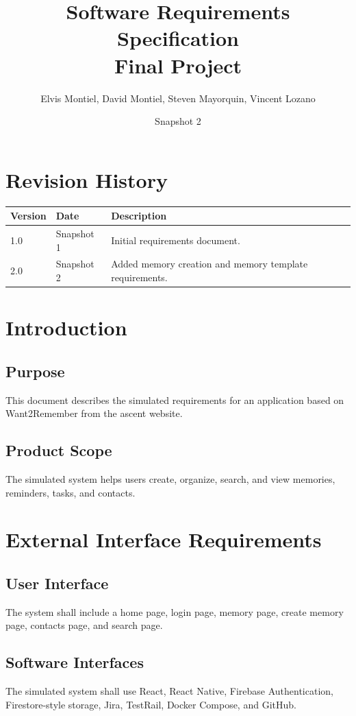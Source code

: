 \documentclass{article}
\title{Software Requirements Specification\\Final Project}
\author{Elvis Montiel, David Montiel, Steven Mayorquin, Vincent Lozano}
\date{Snapshot 2}
\begin{document}
\maketitle
\tableofcontents
\newpage

\section{Revision History}
\begin{longtable}{|p{2cm}|p{3cm}|p{8cm}|}
\hline
Version & Date & Description \\ \hline
1.0 & Snapshot 1 & Initial requirements document. \\ \hline
2.0 & Snapshot 2 & Added memory creation and memory template requirements. \\ \hline
\end{longtable}

\section{Introduction}
\subsection{Purpose}
This document describes the simulated requirements for an application based on Want2Remember from the ascent website.

\subsection{Product Scope}
The simulated system helps users create, organize, search, and view memories, reminders, tasks, and contacts.

\section{External Interface Requirements}
\subsection{User Interface}
The system shall include a home page, login page, memory page, create memory page, contacts page, and search page.

\subsection{Software Interfaces}
The simulated system shall use React, React Native, Firebase Authentication, Firestore-style storage, Jira, TestRail, Docker Compose, and GitHub.
\end{document}
